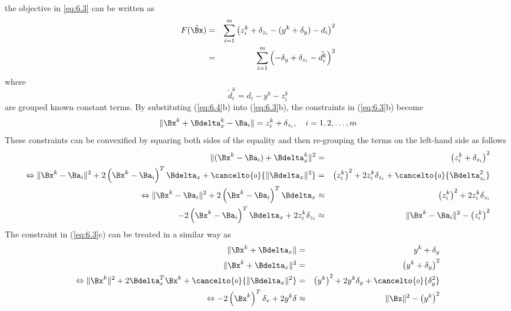  the objective in \ref{eq:6.3} can be written as
 \setcounter{abc}{0}
\begin{eqnarray} \label{eq:6.5} %
F(\hat{\Bx}) & =  & \sum^m_{i = 1} \left(z^k_i + \delta_{z_i} - (y^k + \delta_y) - d_i \right)^2 \\
\nonumber
& = & \sum^m_{i = 1} \left(- \delta_y + \delta_{z_i}  - \tilde{d_i^k} \right)^2
\end{eqnarray}
where 
\begin{equation}
\nonumber
\tilde{d}^k_i =  d_i - y^k - z_i^k
\end{equation}
 are grouped known constant terms. By substituting (\ref{eq:6.4}b) into (\ref{eq:6.3}b), the constraints in (\ref{eq:6.3}b) become
\begin{equation}
\nonumber
\|\Bx^k + \Bdelta^k_x - \Ba_i\| = z^k_i +\delta_{z_i}, \quad i = 1, 2, \ldots, m
\end{equation}
These constraints can be convexified by squaring both sides of the equality and then re-grouping the terms on the left-hand side as follows
\begin{eqnarray}
\nonumber
\|(\Bx^k  - \Ba_i) + \Bdelta^k_x\|^2 & = & \left(z^k_i +\delta_{z_i}\right)^2 \\
\nonumber
\Leftrightarrow 
\|\Bx^k  - \Ba_i\|^2 + 2\left( \Bx^k  - \Ba_i \right)^T\Bdelta_x + \cancelto{\mbox{\scriptsize{0}}}{\|\Bdelta_x\|^2}  & = & \left(z_i^k\right)^2 + 2z_i^k\delta_{z_i} + \cancelto{\mbox{\scriptsize{0}}}{\Bdelta^2_{z_i}} \\
\nonumber
\Leftrightarrow \|\Bx^k  - \Ba_i\|^2 + 2\left( \Bx^k  - \Ba_i \right)^T\Bdelta_x   & \approx & \left(z_i^k\right)^2 + 2z_i^k\delta_{z_i} \\
\nonumber
- 2\left( \Bx^k  - \Ba_i \right)^T\Bdelta_x + 2z_i^k\delta_{z_i}  & \approx & \|\Bx^k  - \Ba_i\|^2 - \left(z_i^k\right)^2
\end{eqnarray}
The constraint in (\ref{eq:6.3}c) can be treated in a similar way as
\begin{eqnarray}
\nonumber
\|\Bx^k + \Bdelta_x\| & = & y^k + \delta_y \\
\nonumber
\|\Bx^k + \Bdelta_x\|^2 & = & \left(y^k + \delta_y \right)^2 \\
\nonumber
\Leftrightarrow \|\Bx^k\|^2 + 2\Bdelta_x^T\Bx^k + \cancelto{\mbox{\scriptsize{0}}}{\|\Bdelta_x\|^2} & = & \left(y^k\right)^2 + 2y^k\delta_y +  \cancelto{\mbox{\scriptsize{0}}}{\delta_y^2} \\
\nonumber
\Leftrightarrow -2\left(\Bx^k\right)^T\delta_x + 2y^k\delta & \approx & \|\Bx\|^2 - \left(y^k\right)^2
\end{eqnarray}
